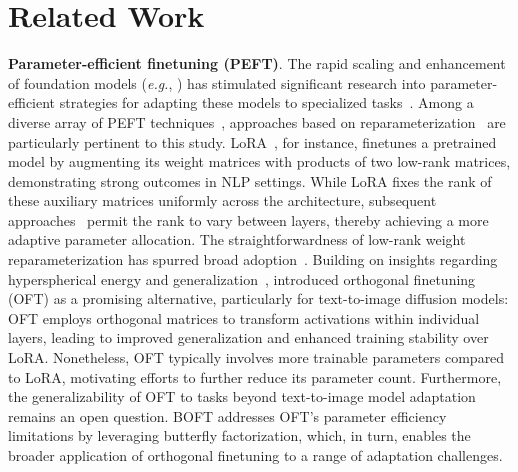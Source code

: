 \section{Related Work}

\textbf{Parameter-efficient finetuning (PEFT)}. The rapid scaling and enhancement of foundation models (\emph{e.g.}, \cite{brown2020language,radford2021learning,rombach2022high,kirillov2023segment}) has stimulated significant research into parameter-efficient strategies for adapting these models to specialized tasks~\cite{treviso2023efficient,ding2023parameter,lialin2023scaling}. Among a diverse array of PEFT techniques~\cite{houlsby2019parameter,aghajanyan2020intrinsic,hulora2022,edalati2022krona,wang2022adamix,gheini2021cross,zaken2022bitfit,guo2020parameter,sung2021training,ansell2022composable,lester2021power,li2021prefix,vu2022spot,he2021towards,mao2021unipelt,karimi2021compacter,liu2022few,sung2022lst,chen2022parameter,jia2022visual,chen2022adaptformer,zhang2022neural,jie2023fact,lian2022scaling,luo2023towards}, approaches based on reparameterization~\cite{aghajanyan2020intrinsic,hulora2022,edalati2022krona} are particularly pertinent to this study. LoRA~\cite{hulora2022}, for instance, finetunes a pretrained model by augmenting its weight matrices with products of two low-rank matrices, demonstrating strong outcomes in NLP settings. While LoRA fixes the rank of these auxiliary matrices uniformly across the architecture, subsequent approaches~\cite{zhang2022adaptive,valipour2022dylora,zhang2023increlora} permit the rank to vary between layers, thereby achieving a more adaptive parameter allocation. The straightforwardness of low-rank weight reparameterization has spurred broad adoption~\cite{dettmers2023qlora,zi2023delta,chavan2023one}. Building on insights regarding hyperspherical energy and generalization~\cite{liu2018learning,liu2021orthogonal}, \cite{qiu2023controlling} introduced orthogonal finetuning (OFT) as a promising alternative, particularly for text-to-image diffusion models: OFT employs orthogonal matrices to transform activations within individual layers, leading to improved generalization and enhanced training stability over LoRA. Nonetheless, OFT typically involves more trainable parameters compared to LoRA, motivating efforts to further reduce its parameter count. Furthermore, the generalizability of OFT to tasks beyond text-to-image model adaptation~\cite{qiu2023controlling} remains an open question. BOFT addresses OFT's parameter efficiency limitations by leveraging butterfly factorization, which, in turn, enables the broader application of orthogonal finetuning to a range of adaptation challenges.

